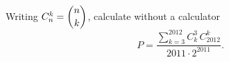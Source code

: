 Writing $C_n^k=\dbinom nk$, calculate without a calculator
\[P=\dfrac{\displaystyle\sum_{k=3}^{2012}C_k^3\,C_{2012}^k}{2011\cdot2^{2011}}.\]
